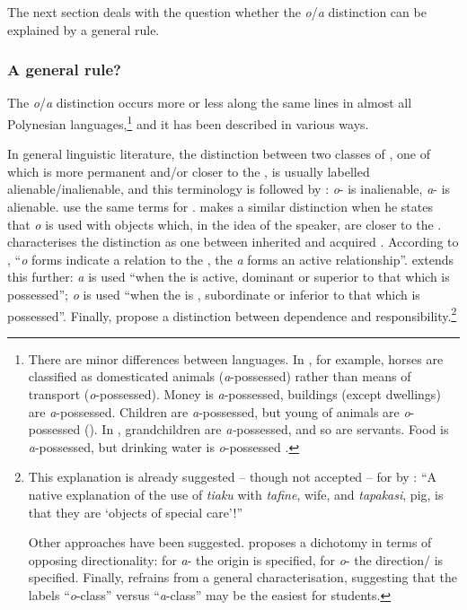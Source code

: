 The next section deals with the question whether the \textit{o}/\textit{a} distinction can be explained by a general rule.

\subsubsection{A general rule?}\label{sec:6.3.4.2}

The \textit{o}/\textit{a} distinction occurs more or less along the same lines in almost all Polynesian languages,\footnote{\label{fn:303}There are minor differences between languages. In , for example, horses are classified as domesticated animals (\textit{a}{}-possessed) rather than means of transport (\textit{o}{}-possessed). Money is \textit{a}{}-possessed, buildings (except dwellings) are \textit{a}{}-possessed. Children are \textit{a}{}-possessed, but young of animals are \textit{o}{}-possessed (\citealt[86–92]{AcadémieTahitienne1986}). In , grandchildren are \textit{a-}possessed, and so are servants. Food is \textit{a}{}-possessed, but drinking water is \textit{o}{}-possessed \citep[44]{Biggs1973}.} and it has been described in various ways. 

In general linguistic literature, the distinction between two classes of , one of which is more permanent and/or closer to the , is usually labelled alienable/inalienable, and this terminology is followed by \citet[102]{DuFeu1996}: \textit{o}{}- is inalienable, \textit{a}{}- is alienable. \citet{PukuiElbert1957} use the same terms for . \citet[42]{Englert1978} makes a similar distinction when he states that \textit{o} is used with objects which, in the idea of the speaker, are closer to the . \citet{Hohepa1967} characterises the distinction as one between inherited and acquired . According to \citet[145]{Capell1931}, “\textit{o} forms indicate a  relation to the , the \textit{a} forms an active relationship”. \citet[43]{Biggs1973} extends this further: \textit{a} is used “when the  is active, dominant or superior to that which is possessed”; \textit{o} is used “when the  is , subordinate or inferior to that which is possessed”. Finally, \citet{MulloyRapu1977} propose a distinction between dependence and responsibility.\footnote{\label{fn:304}This explanation is already suggested – though not accepted – for  by \citet[146]{Capell1931}: “A native explanation of the use of \textit{tiaku} with \textit{tafine}, wife, and \textit{tapakasi}, pig, is that they are ‘objects of special care’!”

Other approaches have been suggested. \citet{Bennardo2000Conceptual,Bennardo2000Possessive} proposes a dichotomy in terms of opposing directionality: for \textit{a}{}- the origin is specified, for \textit{o}{}- the direction/ is specified. Finally, \citet{Elbert1969} refrains from a general characterisation, suggesting that the labels “\textit{o}{}-class” versus “\textit{a}{}-class” may be the easiest for students.} 

